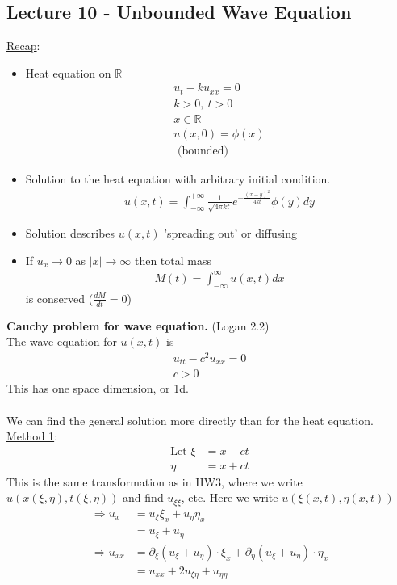 \documentclass[12pt, letterpaper]{article}
\begin{document}
\subsection{Lecture 10 - Unbounded Wave Equation}
\underline{Recap}:
\begin{itemize}
    \item Heat equation on $\mathbb{R}$
    \begin{align*}
        u_t - ku_{xx} = 0 \\
        k > 0,\ t > 0 \\
        x \in \mathbb{R} \\
        u(x,0) = \phi(x)\\ 
        \text{ (bounded)}
    \end{align*}
    \item Solution to the heat equation with arbitrary initial condition.
    \begin{align*}
        u(x,t) = \int_{-\infty}^{+\infty} \frac{1}{\sqrt{4\pi kt}} e^{-\frac{(x-y)^2}{4kt}} \phi(y)dy
    \end{align*}
    \item Solution describes $u(x,t)$ 'spreading out' or diffusing
    \item If $u_x \rightarrow 0$ as $|x| \rightarrow \infty$ then 
    total mass 
    \begin{align*}
        M(t) = \int_{-\infty}^{\infty} u(x,t)dx
    \end{align*}
    is conserved ($\frac{dM}{dt} = 0$)
\end{itemize}
\textbf{Cauchy problem for wave equation.} (Logan 2.2) \\
The wave equation for $u(x,t)$ is 
\begin{align*}
    u_{tt} - c^2u_{xx} = 0 \\
    c > 0 
\end{align*}
This has one space dimension, or 1d. \\ \\ 
We can find the general solution more directly than for the heat equation. \\
\underline{Method 1}:
\begin{align*}
    \text{Let } \xi &= x - ct \\
    \eta &= x + ct
\end{align*}
This is the same transformation as in HW3, where we write $u(x(\xi,\eta), t(\xi,\eta))$ 
and find $u_{\xi\xi}$, etc. Here we write $u(\xi(x,t),\eta(x,t))$
\begin{align*}
    \Rightarrow u_x &= u_\xi \xi_x + u_\eta \eta_x \\
    &= u_\xi + u_\eta \\
    \Rightarrow u_{xx} &= \partial_\xi (u_\xi + u_\eta) \cdot \xi_x + \partial_\eta(u_\xi + u_\eta)\cdot \eta_x \\
    &= u_{xx} + 2u_{\xi\eta} + u_{\eta\eta}
\end{align*}
\end{document}
